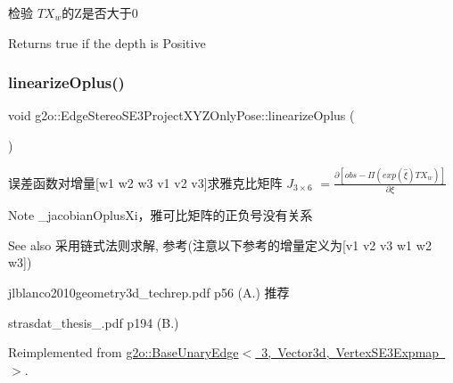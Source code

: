 检验 $ TX_w $的\+Z是否大于0 \begin{DoxyReturn}{Returns}
true if the depth is Positive 
\end{DoxyReturn}
\mbox{\label{classg2o_1_1_edge_stereo_s_e3_project_x_y_z_only_pose_a0b2b815e8ae331276f33be374dcc1897}} 
\subsubsection{\texorpdfstring{linearize\+Oplus()}{linearizeOplus()}}
{\footnotesize\ttfamily void g2o\+::\+Edge\+Stereo\+S\+E3\+Project\+X\+Y\+Z\+Only\+Pose\+::linearize\+Oplus (\begin{DoxyParamCaption}{ }\end{DoxyParamCaption})\hspace{0.3cm}{\ttfamily [virtual]}}

误差函数对增量\mbox{[}w1 w2 w3 v1 v2 v3\mbox{]}求雅克比矩阵 $J_{3\times6}$ $ = \frac{\partial [obs - \Pi(exp(\hat{\xi}) T X_w)]}{\partial \xi} $ \begin{DoxyNote}{Note}
\+\_\+jacobian\+Oplus\+Xi，雅可比矩阵的正负号没有关系 
\end{DoxyNote}
\begin{DoxySeeAlso}{See also}
采用链式法则求解, 参考(注意以下参考的增量定义为\mbox{[}v1 v2 v3 w1 w2 w3\mbox{]})
\begin{DoxyItemize}
\item jlblanco2010geometry3d\+\_\+techrep.\+pdf p56 (A.) 推荐
\item strasdat\+\_\+thesis\+\_.\+pdf p194 (B.) 
\end{DoxyItemize}
\end{DoxySeeAlso}


Reimplemented from \mbox{\hyperlink{classg2o_1_1_base_unary_edge_a367f19b903938faf6e89dd1b0e4e722b}{g2o\+::\+Base\+Unary\+Edge$<$ 3, Vector3d, Vertex\+S\+E3\+Expmap $>$}}.

\mbox{\label{classg2o_1_1_edge_stereo_s_e3_project_x_y_z_only_pose_ae199c5428259a7d50e9897029ae9fd70}} 
